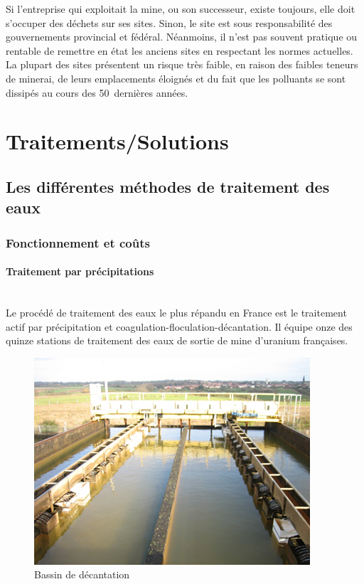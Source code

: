 \documentclass{article}
\begin{document}
Si l'entreprise qui exploitait la mine, ou son successeur, existe toujours, elle doit s'occuper des déchets sur ses sites. Sinon, le site est sous responsabilité des gouvernements provincial et fédéral. 
Néanmoins, il n'est pas souvent pratique ou rentable de remettre en état les anciens sites en respectant les normes actuelles. La plupart des sites présentent un risque très faible, en raison des faibles teneurs de minerai, de leurs emplacements éloignés et du fait que les polluants se sont dissipés au cours des 50~dernières années.


\newpage
\section{Traitements/Solutions}
\subsection{Les différentes méthodes de traitement des eaux}
\subsubsection{Fonctionnement et coûts}

\paragraph{Traitement par précipitations \\ \\}
Le procédé de traitement des eaux le plus répandu en France est le traitement actif par précipitation et coagulation-floculation-décantation. Il équipe onze des quinze stations de traitement des eaux de sortie de mine d'uranium françaises.

\begin{figure}[H]
\centering
\includegraphics[width = 0.5\linewidth]{III_A_1.png}
\caption{Bassin de décantation}
\label{fig:bassin_decantation}
\end{figure}
\end{document}
